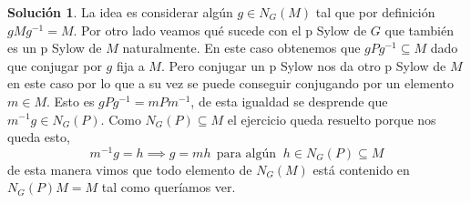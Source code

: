 \documentclass[11pt]{article}
\theoremstyle{plain}
\theoremstyle{definition}
\newtheorem*{sol}{Solución}
\theoremstyle{remark}
\begin{document}
\begin{sol}
	La idea es considerar algún $g \in N_G(M)$ tal que por definición $gMg^{-1} = M$. Por otro lado veamos qué sucede con el p Sylow de $G$ que también es un p Sylow de $M$ naturalmente. En este caso obtenemos que $gPg^{-1} \subseteq M$ dado que conjugar por $g$ fija a $M$. Pero conjugar  un p Sylow nos da otro p Sylow de $M$ en este caso por lo que a su vez se puede conseguir conjugando por un elemento  $m \in M$. Esto es 	$gPg^{-1} = mPm^{-1}$, de esta igualdad se desprende que $m^{-1}g \in N_G(P)$. Como $N_G(P) \subseteq M$ el ejercicio queda resuelto porque nos queda esto,
	\[
	m^{-1}g=h \implies g=mh \ \ \text{para algún } \ h \in N_G(P) \subseteq M
	\]
	de esta manera vimos que todo elemento de $N_G(M)$ está contenido en $N_G(P)M = M$ tal como queríamos ver.
	
\end{sol}




	
\end{document}
